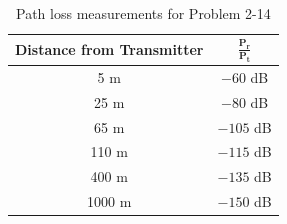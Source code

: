 \documentclass[a4paper,12pt]{book}
\begin{document}
	\begin{table}[h!]
		\centering
		\caption{Path loss measurements for Problem 2-14}
		\begin{tabular}{|c|c|}
			\hline
			\textbf{Distance from Transmitter} & $\mathbf{\frac{P_r}{P_t}}$ \\
			\hline
			5 m   & $-60$ dB \\
			25 m  & $-80$ dB \\
			65 m  & $-105$ dB \\
			110 m & $-115$ dB \\
			400 m & $-135$ dB \\
			1000 m & $-150$ dB \\
			\hline
		\end{tabular}
	\end{table}
	
\end{document}
